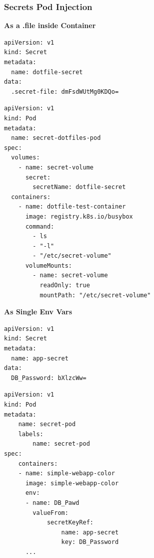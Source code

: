 \documentclass{article}
\newenvironment{codetemplate}[1][]{%
  \mybasecolorbox[#1]
  \itshape
}{%
  \endmybasecolorbox
}
\begin{document}
\subsubsection{Secrets Pod Injection}
\textbf{As a .file inside Container}
\begin{codetemplate}{}
\begin{verbatim}
apiVersion: v1
kind: Secret
metadata:
  name: dotfile-secret
data:
  .secret-file: dmFsdWUtMg0KDQo=
\end{verbatim}
\end{codetemplate}
\begin{codetemplate}{}
\begin{verbatim}
apiVersion: v1
kind: Pod
metadata:
  name: secret-dotfiles-pod
spec:
  volumes:
    - name: secret-volume
      secret:
        secretName: dotfile-secret
  containers:
    - name: dotfile-test-container
      image: registry.k8s.io/busybox
      command:
        - ls
        - "-l"
        - "/etc/secret-volume"
      volumeMounts:
        - name: secret-volume
          readOnly: true
          mountPath: "/etc/secret-volume"
\end{verbatim}
\end{codetemplate}

\textbf{As Single Env Vars}
\begin{codetemplate}{}
\begin{verbatim}
apiVersion: v1
kind: Secret
metadata:
  name: app-secret
data:
  DB_Password: bXlzcWw=
\end{verbatim}
\end{codetemplate}
\begin{codetemplate}{}
\begin{verbatim}
apiVersion: v1
kind: Pod
metadata:
    name: secret-pod
    labels:
        name: secret-pod
spec:
    containers:
    - name: simple-webapp-color
      image: simple-webapp-color
      env:
      - name: DB_Pawd
        valueFrom:
            secretKeyRef:
                name: app-secret
                key: DB_Password
      ...
\end{verbatim}
\end{codetemplate}
\end{document}
